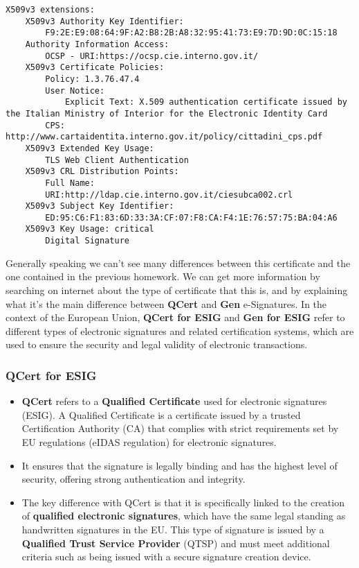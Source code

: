 \documentclass{article}
\begin{document}
\begin{lstlisting}
X509v3 extensions:
    X509v3 Authority Key Identifier: 
        F9:2E:E9:08:64:9F:A2:B8:2B:A8:32:95:41:73:E9:7D:9D:0C:15:18
    Authority Information Access: 
        OCSP - URI:https://ocsp.cie.interno.gov.it/
    X509v3 Certificate Policies: 
        Policy: 1.3.76.47.4
        User Notice:
            Explicit Text: X.509 authentication certificate issued by the Italian Ministry of Interior for the Electronic Identity Card
        CPS: http://www.cartaidentita.interno.gov.it/policy/cittadini_cps.pdf
    X509v3 Extended Key Usage: 
        TLS Web Client Authentication
    X509v3 CRL Distribution Points: 
        Full Name:
        URI:http://ldap.cie.interno.gov.it/ciesubca002.crl
    X509v3 Subject Key Identifier: 
        ED:95:C6:F1:83:6D:33:3A:CF:07:F8:CA:F4:1E:76:57:75:BA:04:A6
    X509v3 Key Usage: critical
        Digital Signature
\end{lstlisting}
Generally speaking we can't see many differences between this certificate and the one contained in the previous homework.
We can get more information by searching on internet about the type of certificate that this is, and by explaining what it's the main difference between \textbf{QCert} and \textbf{Gen} e-Signatures.
In the context of the European Union, \textbf{QCert for ESIG} and \textbf{Gen for ESIG} refer to different types of electronic signatures and related certification systems, which are used to ensure the security and legal validity of electronic transactions.

\subsubsection*{QCert for ESIG}
\begin{itemize}
    \item \textbf{QCert} refers to a \textbf{Qualified Certificate} used for electronic signatures (ESIG). A Qualified Certificate is a certificate issued by a trusted Certification Authority (CA) that complies with strict requirements set by EU regulations (eIDAS regulation) for electronic signatures.
    \item It ensures that the signature is legally binding and has the highest level of security, offering strong authentication and integrity.
    \item The key difference with QCert is that it is specifically linked to the creation of \textbf{qualified electronic signatures}, which have the same legal standing as handwritten signatures in the EU. This type of signature is issued by a \textbf{Qualified Trust Service Provider} (QTSP) and must meet additional criteria such as being issued with a secure signature creation device.
\end{itemize}
\end{document}
